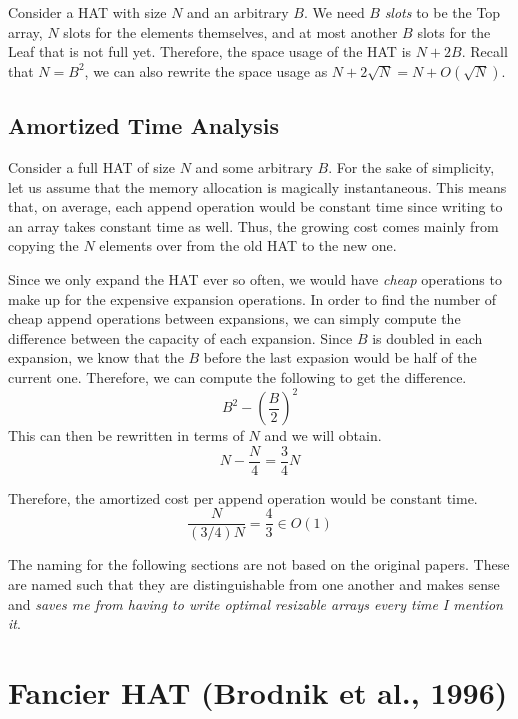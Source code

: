 Consider a HAT with size $N$ and an arbitrary $B$. We need $B$ \textit{slots} to be the Top array,
$N$ slots for the elements themselves, and at most another $B$ slots for the Leaf that is not full
yet. Therefore, the space usage of the HAT is $N + 2B$. Recall that $N = B^2$, we can also rewrite
the space usage as $N + 2\sqrt{N} = N + O(\sqrt{N})$.

\subsection*{Amortized Time Analysis}

Consider a full HAT of size $N$ and some arbitrary $B$. For the sake of simplicity, let us assume
that the memory allocation is magically instantaneous. This means that, on average, each append
operation would be constant time since writing to an array takes constant time as well.
Thus, the growing cost comes mainly from copying the $N$ elements over from the old HAT
to the new one.

Since we only expand the HAT ever so often, we would have \textit{cheap} operations to make up for 
the expensive expansion operations. In order to find the number of cheap append operations between
expansions, we can simply compute the difference between the capacity of each expansion. Since $B$
is doubled in each expansion, we know that the $B$ before the last expasion would be half of the
current one. Therefore, we can compute the following to get the difference.
\[ B^2 - \left(\frac{B}{2}\right)^2 \]
This can then be rewritten in terms of $N$ and we will obtain.
\[ N - \frac{N}{4} = \frac{3}{4}N \]

Therefore, the amortized cost per append operation would be constant time.
\[ \frac{N}{(3/4)N} = \frac{4}{3} \in O(1) \]

\endgroup

\begin{tcolorbox}[title=Disclaimer]
	The naming for the following sections are not based on the original papers. These are named
	such that they are distinguishable from one another and makes sense and \textit{saves me 
	from having to write optimal resizable arrays every time I mention it}.
\end{tcolorbox}

\begingroup

\section{Fancier HAT (Brodnik et al., 1996)}

